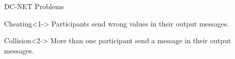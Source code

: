 \begin{frame}{DC-NET Problems}
    
    \begin{exampleblock}{Cheating}<1->
        Participants send wrong values in their output messages.
    \end{exampleblock}
    
    \begin{alertblock}{Collision}<2->
        More than one participant send a message in their output messages.
    \end{alertblock}
    
\end{frame}